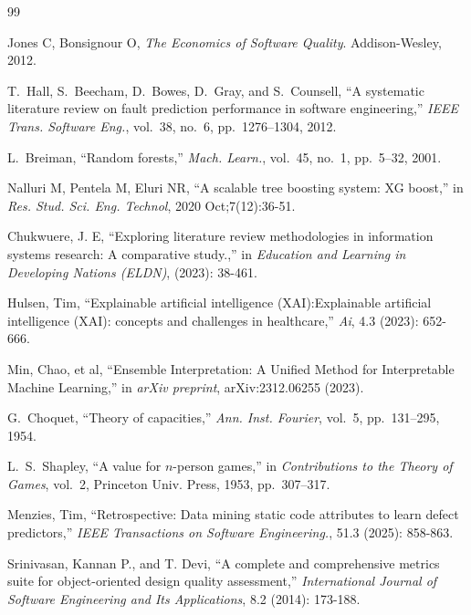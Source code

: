 \documentclass[10pt,twocolumn]{article}
\begin{document}
\balance
\begin{thebibliography}{99}

Jones C, Bonsignour O, \emph{The Economics of Software Quality}. Addison-Wesley, 2012.

T.~Hall, S.~Beecham, D.~Bowes, D.~Gray, and S.~Counsell,
``A systematic literature review on fault prediction performance in software engineering,''
\emph{IEEE Trans. Software Eng.}, vol.~38, no.~6, pp.~1276--1304, 2012.

L.~Breiman, ``Random forests,'' \emph{Mach. Learn.}, vol.~45, no.~1, pp.~5--32, 2001.

Nalluri M, Pentela M, Eluri NR, ``A scalable tree boosting system: XG boost,''
in \emph{Res. Stud. Sci. Eng. Technol}, 2020 Oct;7(12):36-51.

Chukwuere, J. E, ``Exploring literature review methodologies in information systems research: A comparative study.,''
in \emph{Education and Learning in Developing Nations (ELDN)}, (2023): 38-461.

Hulsen, Tim, ``Explainable artificial intelligence (XAI):Explainable artificial intelligence (XAI): concepts and challenges in healthcare,'' \emph{Ai}, 4.3 (2023): 652-666.

Min, Chao, et al, ``Ensemble Interpretation: A Unified Method for Interpretable Machine Learning,''
in \emph{arXiv preprint}, arXiv:2312.06255 (2023).

G.~Choquet, ``Theory of capacities,'' \emph{Ann. Inst. Fourier}, vol.~5, pp.~131--295, 1954.

L.~S.~Shapley, ``A value for $n$-person games,'' in \emph{Contributions to the Theory of Games},
vol.~2, Princeton Univ. Press, 1953, pp.~307--317.

Menzies, Tim, ``Retrospective: Data mining static code attributes to learn defect predictors,'' \emph{IEEE Transactions on Software Engineering.}, 51.3 (2025): 858-863.

Srinivasan, Kannan P., and T. Devi, ``A complete and comprehensive metrics suite for object-oriented design quality assessment,''
\emph{International Journal of Software Engineering and Its Applications}, 8.2 (2014): 173-188.


\end{thebibliography}
\end{document}
